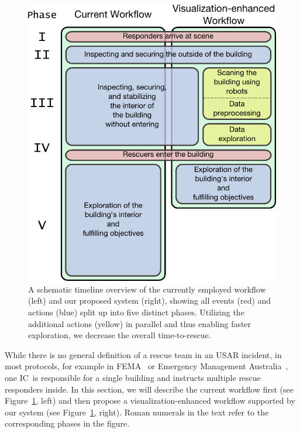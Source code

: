 \documentclass{egpubl}
\def\IC{IC}
\begin{document}
\begin{figure}
	\centering
	\includegraphics[width=0.9\columnwidth]{figures/workflow.pdf}
	\caption{A schematic timeline overview of the currently employed workflow (left) and our proposed system (right), showing all events (red) and actions (blue) split up into five distinct phases. Utilizing the additional actions (yellow) in parallel and thus enabling faster exploration, we decrease the overall time-to-rescue.}
	\label{fig:workflow:workflow}
\end{figure}

While there is no general definition of a rescue team in an USAR incident, in most protocols, for example in FEMA~\cite{fema08} or Emergency Management Australia~\cite{em35}, one \IC\ is responsible for a single building and instructs multiple rescue responders inside. In this section, we will describe the current workflow first (see Figure~\ref{fig:workflow:workflow}, left) and then propose a visualization-enhanced workflow supported by our system (see Figure~\ref{fig:workflow:workflow}, right). Roman numerals in the text refer to the corresponding phases in the figure.
\end{document}
